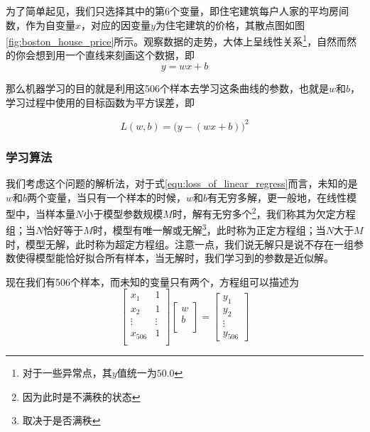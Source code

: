 为了简单起见，我们只选择其中的第6个变量，即住宅建筑每户人家的平均房间数，作为自变量$x$，对应的因变量$y$为住宅建筑的价格，其散点图如图\ref{fig:boston_house_price}所示。观察数据的走势，大体上呈线性关系\footnote{对于一些异常点，其$y$值统一为$50.0$}，自然而然的你会想到用一个直线来刻画这个数据，即
\begin{equation}
	y = wx + b
\end{equation}

那么机器学习的目的就是利用这506个样本去学习这条曲线的参数，也就是$w$和$b$，学习过程中使用的目标函数为平方误差，即

\begin{equation}\label{equ:loss_of_linear_regress}
	L(w, b) = \Big(y - (wx + b)\Big)^2
\end{equation}



\subsubsection{学习算法} %
\label{ssub:学习算法}
我们考虑这个问题的解析法，对于式\ref{equ:loss_of_linear_regress}而言，未知的是$w$和$b$两个变量，当只有一个样本的时候，$w$和$b$有无穷多解，更一般地，在线性模型中，当样本量$N$小于模型参数规模$M$时，解有无穷多个\footnote{因为此时是不满秩的状态}，我们称其为欠定方程组；当$N$恰好等于$M$时，模型有唯一解或无解\footnote{取决于是否满秩}，此时称为正定方程组；当$N$大于$M$时，模型无解，此时称为超定方程组。注意一点，我们说无解只是说不存在一组参数使得模型能恰好拟合所有样本，当无解时，我们学习到的参数是近似解。

现在我们有506个样本，而未知的变量只有两个，方程组可以描述为
\begin{equation}\label{eq:欠定方程组}
\begin{bmatrix}
	x_{1} & 1\\
	x_{2} & 1\\
	\vdots & \vdots\\
	x_{506} &  1\\
\end{bmatrix}
\begin{bmatrix}
	w\\
	b\\
\end{bmatrix}
= 
\begin{bmatrix}
	y_{1}\\
	y_{2}\\
	\vdots\\
	y_{506}
\end{bmatrix}
\end{equation}

